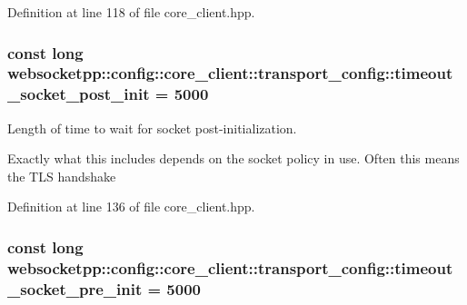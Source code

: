 Definition at line 118 of file core\+\_\+client.\+hpp.

\subsubsection[{\texorpdfstring{timeout\+\_\+socket\+\_\+post\+\_\+init}{timeout\_socket\_post\_init}}]{\setlength{\rightskip}{0pt plus 5cm}const long websocketpp\+::config\+::core\+\_\+client\+::transport\+\_\+config\+::timeout\+\_\+socket\+\_\+post\+\_\+init = 5000\hspace{0.3cm}{\ttfamily [static]}}\hypertarget{structwebsocketpp_1_1config_1_1core__client_1_1transport__config_af375d91583cd6e2a93fef38c75822d82}{}\label{structwebsocketpp_1_1config_1_1core__client_1_1transport__config_af375d91583cd6e2a93fef38c75822d82}


Length of time to wait for socket post-\/initialization. 

Exactly what this includes depends on the socket policy in use. Often this means the T\+LS handshake 

Definition at line 136 of file core\+\_\+client.\+hpp.

\subsubsection[{\texorpdfstring{timeout\+\_\+socket\+\_\+pre\+\_\+init}{timeout\_socket\_pre\_init}}]{\setlength{\rightskip}{0pt plus 5cm}const long websocketpp\+::config\+::core\+\_\+client\+::transport\+\_\+config\+::timeout\+\_\+socket\+\_\+pre\+\_\+init = 5000\hspace{0.3cm}{\ttfamily [static]}}\hypertarget{structwebsocketpp_1_1config_1_1core__client_1_1transport__config_a529a1a4bf59b86dfebbf0e65b3b1ce25}{}\label{structwebsocketpp_1_1config_1_1core__client_1_1transport__config_a529a1a4bf59b86dfebbf0e65b3b1ce25}


